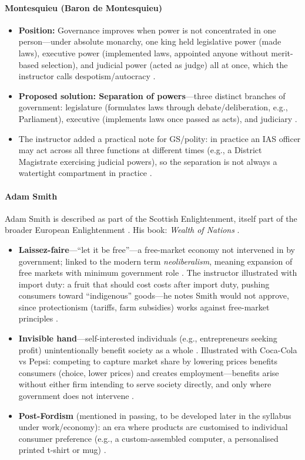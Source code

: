 \paragraph{Montesquieu (Baron de Montesquieu)}
\begin{KeyConcept}
\begin{itemize}
    \item \textbf{Position:} Governance improves when power is not concentrated in one person---under absolute monarchy, one king held legislative power (made laws), executive power (implemented laws, appointed anyone without merit-based selection), and judicial power (acted as judge) all at once, which the instructor calls despotism/autocracy .
    \item \textbf{Proposed solution: Separation of powers}---three distinct branches of government: legislature (formulates laws through debate/deliberation, e.g., Parliament), executive (implements laws once passed as acts), and judiciary .
    \item The instructor added a practical note for GS/polity: in practice an IAS officer may act across all three functions at different times (e.g., a District Magistrate exercising judicial powers), so the separation is not always a watertight compartment in practice .
\end{itemize}
\end{KeyConcept}

\paragraph{Adam Smith}
\begin{KeyConcept}
Adam Smith is described as part of the Scottish Enlightenment, itself part of the broader European Enlightenment . His book: \textit{Wealth of Nations} .
\begin{itemize}
    \item \textbf{Laissez-faire}---``let it be free''---a free-market economy not intervened in by government; linked to the modern term \textit{neoliberalism}, meaning expansion of free markets with minimum government role . The instructor illustrated with import duty: a fruit that should cost  costs  after import duty, pushing consumers toward ``indigenous'' goods---he notes Smith would not approve, since protectionism (tariffs, farm subsidies) works against free-market principles .
    \item \textbf{Invisible hand}---self-interested individuals (e.g., entrepreneurs seeking profit) unintentionally benefit society as a whole . Illustrated with Coca-Cola vs Pepsi: competing to capture market share by lowering prices benefits consumers (choice, lower prices) and creates employment---benefits arise without either firm intending to serve society directly, and only where government does not intervene .
    \item \textbf{Post-Fordism} (mentioned in passing, to be developed later in the syllabus under work/economy): an era where products are customised to individual consumer preference (e.g., a custom-assembled computer, a personalised printed t-shirt or mug) .
\end{itemize}
\end{KeyConcept}

